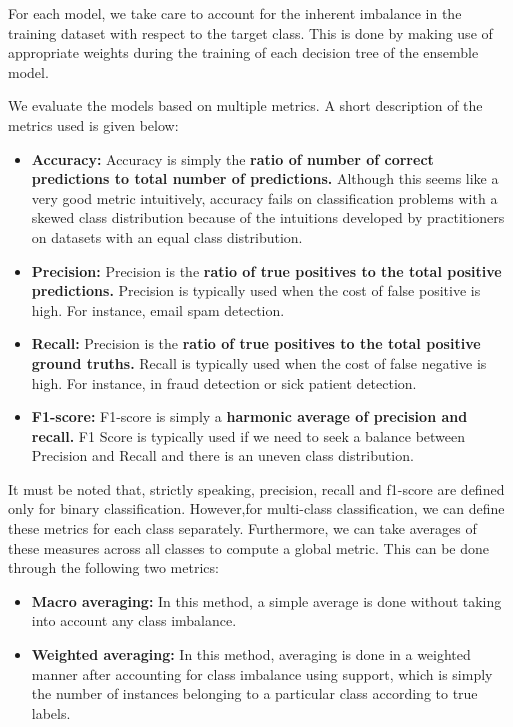 \documentclass[conference]{IEEEtran}
\begin{document}
For each model, we take care to account for the inherent imbalance in the training dataset with respect to the target class. This is done by making use of appropriate weights during the training of each decision tree of the ensemble model.

We evaluate the models based on multiple metrics. A short description of the metrics used is given below:

\begin{itemize}
    \item \textbf{Accuracy:}
    Accuracy is simply the \textbf{ratio of number of correct predictions to total number of predictions.} Although this seems like a very good metric intuitively, accuracy fails on classification problems with a skewed class distribution because of the intuitions developed by practitioners on datasets with an equal class distribution.
    \item \textbf{Precision:}
    Precision is the \textbf{ratio of true positives to the total positive predictions.} Precision is typically used when the cost of false positive is high. For instance, email spam detection.
    \item \textbf{Recall:}
    Precision is the \textbf{ratio of true positives to the total positive ground truths.} Recall is typically used when the cost of false negative is high. For instance, in fraud detection or sick patient detection.
    \item \textbf{F1-score:}
    F1-score is simply a \textbf{harmonic average of precision and recall.} F1 Score is typically used if we need to seek a balance between Precision and Recall and there is an uneven class distribution.
    
    
\end{itemize}

It must be noted that, strictly speaking, precision, recall and f1-score are defined only for binary classification. However,for multi-class classification, we can define these metrics for each class separately. Furthermore, we can take averages of these measures across all classes to compute a global metric. This can be done through the following two metrics:
\begin{itemize}
    \item \textbf{Macro averaging:} In this method, a simple average is done without taking into account any class imbalance.
    \item \textbf{Weighted averaging:} In this method, averaging is done in a weighted manner after accounting for class imbalance using support, which is simply the number of instances belonging to a particular class according to true labels.
\end{itemize}
\end{document}

